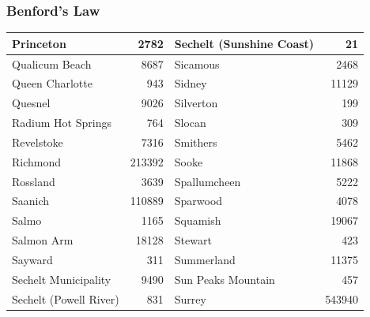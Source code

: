 \documentclass[xcolor=dvipsnames]{beamer}
\begin{document}
\begin{frame}
  \frametitle{Benford's Law}
\begin{tabular}{|l|r|l|r|}
\hline
Princeton              & 2782   & Sechelt (Sunshine Coast) & 21     \\
\hline
Qualicum Beach         & 8687   & Sicamous                 & 2468   \\
\hline
Queen Charlotte        & 943    & Sidney                   & 11129  \\
\hline
Quesnel                & 9026   & Silverton                & 199    \\
\hline
Radium Hot Springs     & 764    & Slocan                   & 309    \\
\hline
Revelstoke             & 7316   & Smithers                 & 5462   \\
\hline
Richmond               & 213392 & Sooke                    & 11868  \\
\hline
Rossland               & 3639   & Spallumcheen             & 5222   \\
\hline
Saanich                & 110889 & Sparwood                 & 4078   \\
\hline
Salmo                  & 1165   & Squamish                 & 19067  \\
\hline
Salmon Arm             & 18128  & Stewart                  & 423    \\
\hline
Sayward                & 311    & Summerland               & 11375  \\
\hline
Sechelt Municipality   & 9490   & Sun Peaks Mountain       & 457    \\
\hline
Sechelt (Powell River) & 831    & Surrey                   & 543940 \\
\hline
\end{tabular}

\end{frame}
\end{document}
